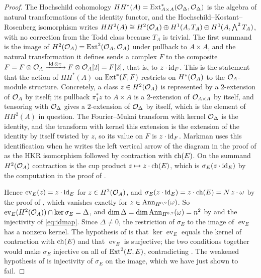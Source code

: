 \begin{proof}
The Hochschild cohomology $HH^{*}(A)=\operatorname{Ext}^{*}_{A\times A}(\mathcal{O}_{\Delta},\mathcal{O}_{\Delta})$
is the algebra of natural transformations of the identity functor, and the
Hochschild--Kostant--Rosenberg isomorphism \cite{Cal05,BF08} writes
$HH^{2}(A)\cong H^{2}(\mathcal{O}_{A})\oplus H^{1}(A,T_{A})\oplus H^{0}(A,\bigwedge^{2}T_{A})$,
with no correction from the Todd class because $T_{A}$ is trivial. The first
summand is the image of $H^{2}(\mathcal{O}_{A})=\operatorname{Ext}^{2}(\mathcal{O}_{A},\mathcal{O}_{A})$ under
pullback to $A\times A$, and the natural transformation it defines sends a
complex $F$ to the composite $F=F\otimes\mathcal{O}_{A}\xrightarrow{\;\operatorname{id}\otimes z\;}
F\otimes\mathcal{O}_{A}[2]=F[2]$, that is, to $z\cdot\operatorname{id}_{F}$. This is the statement
that the action of $HH^{*}(A)$ on $\operatorname{Ext}^{*}(F,F)$ restricts on $H^{*}(\mathcal{O}_{A})$
to the $\mathcal{O}_{A}$-module structure. Concretely, a class $z\in H^{2}(\mathcal{O}_{A})$
is represented by a $2$-extension of $\mathcal{O}_{A}$ by itself; its pullback
$\pi_{1}^{*}z$ to $A\times A$ is a $2$-extension of $\mathcal{O}_{A\times A}$ by
itself, and tensoring with $\mathcal{O}_{\Delta}$ gives a $2$-extension of
$\mathcal{O}_{\Delta}$ by itself, which is the element of $HH^{2}(A)$ in question. The
Fourier--Mukai transform with kernel $\mathcal{O}_{\Delta}$ is the identity, and the
transform with kernel this extension is the extension of the identity by
itself twisted by $z$, so its value on $F$ is $z\cdot\operatorname{id}_{F}$. Markman uses
this identification when he writes the left vertical arrow of the diagram in
the proof of \cite[Lemma~11.3]{Mar25b} as the HKR isomorphism followed by
contraction with $\operatorname{ch}(E)$. On the summand $H^{2}(\mathcal{O}_{A})$ contraction is the
cup product $z\mapsto z\cdot\operatorname{ch}(E)$, which is $\sigma_{E}(z\cdot\operatorname{id}_{E})$ by
the computation in the proof of .

Hence $\operatorname{ev}_{E}(z)=z\cdot\operatorname{id}_{E}$ for $z\in H^{2}(\mathcal{O}_{A})$, and
$\sigma_{E}(z\cdot\operatorname{id}_{E})=z\cdot\operatorname{ch}(E)=N\,z\cdot\omega$ by the proof of
, which vanishes exactly for
$z\in\operatorname{Ann}_{H^{0,2}}(\omega)$. So
$\operatorname{ev}_{E}(H^{2}(\mathcal{O}_{A}))\cap\ker\sigma_{E}=\Delta$, and
$\dim\Delta=\dim\operatorname{Ann}_{H^{0,2}}(\omega)=n^{2}$ by  and
the injectivity of \eqref{eq:idmap}. Since $\Delta\ne0$, the restriction of
$\sigma_{E}$ to the image of $\operatorname{ev}_{E}$ has a nonzero kernel.
The hypothesis of \cite[Lemma 11.3]{Mar25b} is that
$\ker\operatorname{ev}_{E}$ equals the kernel of contraction with $\operatorname{ch}(E)$ and
that $\operatorname{ev}_{E}$ is surjective; the two conditions together would
make $\sigma_{E}$ injective on all of $\operatorname{Ext}^{2}(E,E)$, contradicting
. The weakened hypothesis of
\cite[Question 11.4]{Mar25b} is injectivity of $\sigma_{E}$ on the image,
which we have just shown to fail.
\end{proof}


